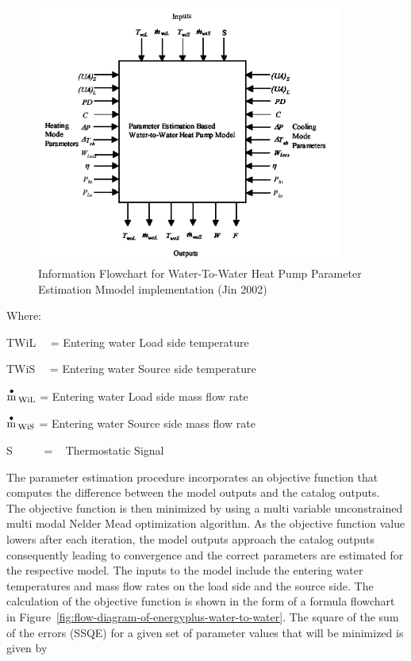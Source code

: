 \begin{figure}[hbtp] %
\centering
\includegraphics[width=0.9\textwidth, height=0.9\textheight, keepaspectratio=true]{media/image5306.png}
\caption{  Information Flowchart for Water-To-Water Heat Pump Parameter Estimation Mmodel implementation (Jin 2002) \protect \label{fig:information-flowchart-for-water-to-water-heat}}
\end{figure}

Where:

TWiL~~ = Entering water Load side temperature

TWiS~~ = Entering water Source side temperature

\(\mathop {\rm{m}}\limits^ \bullet {}_{{\rm{WiL}}}\) = Entering water Load side mass flow rate

\(\mathop {\rm{m}}\limits^ \bullet {}_{{\rm{WiS}}}\) = Entering water Source side mass flow rate

S~~~~~ = ~ Thermostatic Signal

The parameter estimation procedure incorporates an objective function that computes the difference between the model outputs and the catalog outputs.~ The objective function is then minimized by using a multi variable unconstrained multi modal Nelder Mead optimization algorithm. As the objective function value lowers after each iteration, the model outputs approach the catalog outputs consequently leading to convergence and the correct parameters are estimated for the respective model. The inputs to the model include the entering water temperatures and mass flow rates on the load side and the source side. The calculation of the objective function is shown in the form of a formula flowchart in Figure~\ref{fig:flow-diagram-of-energyplus-water-to-water}. The square of the sum of the errors (SSQE) for a given set of parameter values that will be minimized is given by

